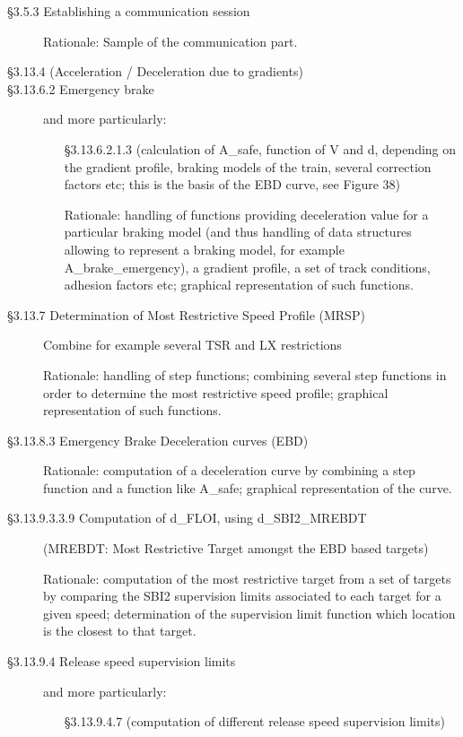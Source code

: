 \documentclass{template/openetcs_article}
\begin{document}
\begin{description}
\item [§3.5.3 Establishing a communication session]

  Rationale: Sample of the communication part.

\item [§3.13.4 (Acceleration / Deceleration due to gradients)]

\item[§3.13.6.2 Emergency brake] and more particularly:
  \begin{itemize}
  \item[§3.13.6.2.1.3] (calculation of A\_safe, function of V and d,
    depending on the gradient profile, braking models of the train,
    several correction factors etc; this is the basis of the EBD
    curve, see Figure 38)
		
		Rationale:  handling of functions providing deceleration value for a particular braking model (and thus handling of data structures allowing to represent a braking model, for example A\_brake\_emergency), a gradient profile, a set of track conditions, adhesion factors etc; graphical representation of such functions.
  \end{itemize}

\item[§3.13.7 Determination of Most Restrictive Speed Profile (MRSP)]
  Combine for example several TSR and LX restrictions
	
	Rationale: handling of step functions; combining several step functions in order to determine the most restrictive speed profile; graphical representation of such functions.

\item[§3.13.8.3 Emergency Brake Deceleration curves (EBD)]

Rationale: computation of a deceleration curve by combining a step function and a function like A\_safe; graphical representation of the curve.

\item[§3.13.9.3.3.9 Computation of d\_FLOI, using d\_SBI2\_MREBDT]
  (MREBDT: Most Restrictive Target amongst the EBD based targets)
	
	Rationale: computation of the most restrictive target from a set of targets by comparing the SBI2 supervision limits associated to each target for a given speed; determination of the supervision limit function which location is the closest to that target.

\item[§3.13.9.4 Release speed supervision limits] and more
  particularly:
  \begin{itemize}
  \item[§3.13.9.4.7] (computation of different release speed
    supervision limits)
		

\end{itemize}
\end{description}
\end{document}
